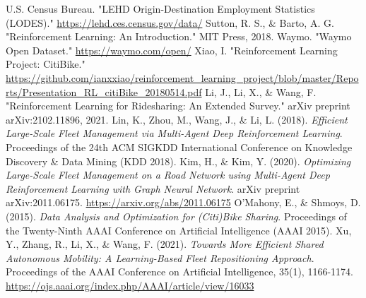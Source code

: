 \documentclass[12pt]{article}
\begin{document}
\begin{thebibliography}{9}

		 U.S. Census Bureau. "LEHD Origin-Destination Employment Statistics
		(LODES)." \url{https://lehd.ces.census.gov/data/}
		 Sutton, R. S., \& Barto, A. G. "Reinforcement Learning: An
		Introduction." MIT Press, 2018.
		 Waymo. "Waymo Open Dataset." \url{https://waymo.com/open/}
		 Xiao, I. "Reinforcement Learning Project: CitiBike."
		\url{https://github.com/ianxxiao/reinforcement_learning_project/blob/master/Reports/Presentation_RL_citiBike_20180514.pdf}
		 Li, J., Li, X., \& Wang, F. "Reinforcement Learning for
		Ridesharing: An Extended Survey." arXiv preprint arXiv:2102.11896, 2021.
		 Lin, K., Zhou, M., Wang, J., \& Li, L. (2018). \textit{Efficient
		Large-Scale Fleet Management via Multi-Agent Deep Reinforcement Learning}. Proceedings
		of the 24th ACM SIGKDD International Conference on Knowledge Discovery \& Data Mining (KDD 2018).
		 Kim, H., \& Kim, Y. (2020). \textit{Optimizing Large-Scale Fleet
				Management on a Road Network using Multi-Agent Deep Reinforcement Learning with Graph
		Neural Network}. arXiv preprint arXiv:2011.06175. \url{https://arxiv.org/abs/2011.06175}
		 O’Mahony, E., \& Shmoys, D. (2015). \textit{Data Analysis and
		Optimization for (Citi)Bike Sharing}. Proceedings of the Twenty-Ninth AAAI Conference
		on Artificial Intelligence (AAAI 2015).
		 Xu, Y., Zhang, R., Li, X., \& Wang, F. (2021). \textit{Towards More
		Efficient Shared Autonomous Mobility: A Learning-Based Fleet Repositioning Approach}.
		Proceedings of the AAAI Conference on Artificial Intelligence, 35(1), 1166-1174.
		\url{https://ojs.aaai.org/index.php/AAAI/article/view/16033}

\end{thebibliography}
\end{document}
